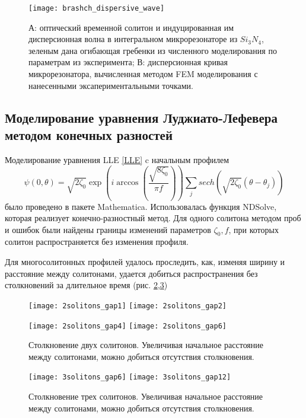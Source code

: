 \begin{figure}
  \centering
  \texttt{[image: brashch\_dispersive\_wave]}

  \caption{А: оптический временной солитон и индуцированная им дисперсионная волна в интегральном микрорезонаторе из $Si_3N_4$, зеленым дана огибающая гребенки из численного моделирования по параметрам из эксперимента; В: дисперсионная кривая микрорезонатора, вычисленная методом FEM моделирования с нанесенными эксапериментальными точками.} \label{brashch_dispersive_wave}
\end{figure}


\subsection{Моделирование уравнения Луджиато-Лефевера методом конечных разностей}

Моделирование уравнения LLE \eqref{LLE} c начальным профилем
\begin{equation}
\psi(0,\theta)=\sqrt{2\zeta_0}\exp (i \arccos(\frac{\sqrt{8\zeta_0}}{\pi f}))\sum_j sech(\sqrt{2\zeta_0}(\theta-\theta_j))
\end{equation}
было проведено в пакете Mathematica. Использовалась функция NDSolve, которая реализует конечно-разностный метод. Для одного солитона методом проб и ошибок были найдены границы изменений параметров $\zeta_0,f$, при которых солитон распространяется без изменения профиля.

Для многосолитонных профилей удалось проследить, как, изменяя ширину и расстояние между солитонами, удается добиться распространения без столкновений за длительное время (рис. \ref{2solitons},\ref{3solitons})
\begin{figure}
  \texttt{[image: 2solitons\_gap1]}
  \texttt{[image: 2solitons\_gap2]}
\end{figure}

\begin{figure}
  \texttt{[image: 2solitons\_gap4]}
  \texttt{[image: 2solitons\_gap6]}
  \caption{Столкновение двух солитонов. Увеличивая начальное расстояние между солитонами, можно добиться отсутствия столкновения.} \label{2solitons}
\end{figure}

\begin{figure}

  \texttt{[image: 3solitons\_gap6]}
  \texttt{[image: 3solitons\_gap12]}
  \caption{Столкновение трех солитонов. Увеличивая начальное расстояние между солитонами, можно добиться отсутствия столкновения.} \label{3solitons}
\end{figure}


